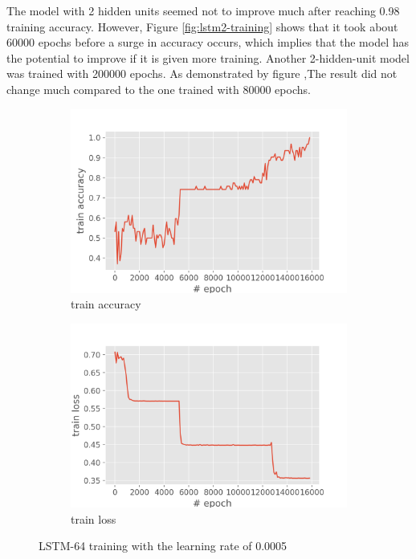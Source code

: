 \documentclass[12pt,article]{article}
\begin{document}
The model with 2 hidden units seemed not to improve much after reaching 0.98 training accuracy. However, Figure \ref{fig:lstm2-training} shows that it took about 60000 epochs before a surge in accuracy occurs, which implies that the model has the potential to improve if it is given more training. Another 2-hidden-unit model was trained with 200000 epochs. As demonstrated by figure ,The result did not change much compared to the one trained with 80000 epochs.

\begin{figure}[H]
\centering
\begin{subfigure}{.5\textwidth}
    \centering
    \includegraphics[scale=0.6]{LSTM-64_parity_train_accuracy.png} \par
    \caption{train accuracy}
\end{subfigure}%
\begin{subfigure}{.5\textwidth}
    \centering
    \includegraphics[scale=0.6]{LSTM-64_parity_train_loss.png} \par
    \caption{train loss}
\end{subfigure}
\caption{LSTM-64 training with the learning rate of 0.0005}
\label{fig:lstm64-training}
\end{figure}
\end{document}
